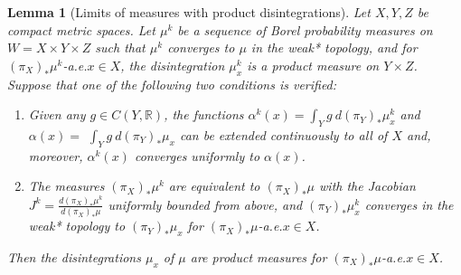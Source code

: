 \documentclass[11pt,letterpaper,reqno]{article}
\newtheorem{lemma}{Lemma}[section]
\newcommand{\R}{\mathbb{R}}
\begin{document}
\begin{lemma}[Limits of measures with product disintegrations]\label{le:limitproductd}
Let $X, Y, Z$ be compact metric spaces. Let $\mu^k$ be a sequence of Borel probability measures on $W =X \times Y \times Z$ such that $\mu^k$ converges to $\mu$ in the weak* topology, and for $(\pi_{X})_* \mu^k$-a.e.\@ $x \in X$, the disintegration $\mu_x^k$ is a product measure on $Y \times Z$.\\
Suppose that one of the following two conditions is verified:
\begin{enumerate}

\item
Given any $g \in C(Y, \R)$, the functions $\alpha^k(x) = \int_Y g \ d(\pi_Y)_* \mu_x^k$ and \newline $\alpha(x) =$ $\int_Y g \ d(\pi_Y)_* \mu_x$ can be extended continuously to all of $X$ and, moreover, $\alpha^k(x)$ converges uniformly to $\alpha(x)$. 

\item
The measures $(\pi_{X})_* \mu^k$ are equivalent to $(\pi_{X})_* \mu$ with the Jacobian $J^k=\frac{d(\pi_{X})_* \mu^k}{d(\pi_{X})_* \mu}$ uniformly bounded from above, and $(\pi_Y)_*\mu_x^k$ converges in the weak* topology to $(\pi_Y)_*\mu_x$ for $(\pi_{X})_*\mu$-a.e.\@ $x\in X$.
\end{enumerate}
Then the disintegrations $\mu_x$ of $\mu$ are product measures for $(\pi_{X})_* \mu$-a.e.\@ $x\in X$.
\end{lemma}
\end{document}
